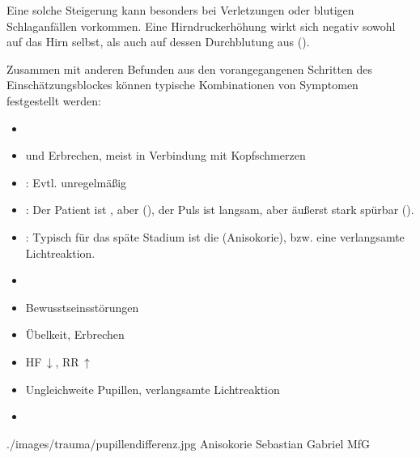 {%
\label{topic:hirndruckzeichen}%
%
Eine solche Steigerung kann besonders bei Verletzungen 
oder blutigen Schlaganfällen vorkommen. 
%
Eine Hirndruckerhöhung wirkt sich negativ sowohl auf das Hirn selbst, 
als auch auf dessen Durchblutung aus 
(). 

Zusammen mit anderen Befunden 
aus den vorangegangenen Schritten 
des Einschätzungsblockes 
können typische Kombinationen 
von Symptomen festgestellt werden: 
\begin{itemize}
  \item {} 
  \item {}  und Erbrechen, 
  meist in Verbindung mit Kopfschmerzen
  \item {} : Evtl. unregelmäßig
  \item {} : 
  Der Patient ist , aber  
  (), 
  der Puls ist langsam, 
  aber äußerst stark spürbar (). 
  \item {}: 
  Typisch für das späte Stadium ist die  
  {(Anisokorie)}, 
  bzw. eine verlangsamte Lichtreaktion.
  \item {}
\end{itemize}
\nocite{StriebelAnaesthesie2} %
}
{
\begin{itemize}
  \item {} Bewusstseinsstörungen
  \item {} Übelkeit, Erbrechen
  \item {} HF\,$\downarrow$, RR\,$\uparrow$
  \item Ungleichweite Pupillen, verlangsamte Lichtreaktion
  \item {}
\end{itemize}
}
{./images/trauma/pupillendifferenz.jpg}%
{Anisokorie}%
{}%
{Sebastian Gabriel}%
{MfG}%

